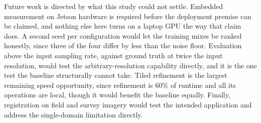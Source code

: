 \documentclass[conference]{IEEEtran}
\begin{document}
Future work is directed by what this study could not settle. Embedded measurement
on Jetson hardware is required before the deployment premise can be claimed, and
nothing else here turns on a laptop GPU the way that claim does. A second seed
per configuration would let the training mixes be ranked honestly, since three of
the four differ by less than the noise floor. Evaluation above the input sampling
rate, against ground truth at twice the input resolution, would test the
arbitrary-resolution capability directly, and it is the one test the baseline
structurally cannot take. Tiled refinement is the largest remaining speed
opportunity, since refinement is 60\% of runtime and all its operations are
local, though it would benefit the baseline equally. Finally, registration on
field and survey imagery would test the intended application and address the
single-domain limitation directly.

\balance
\end{document}
